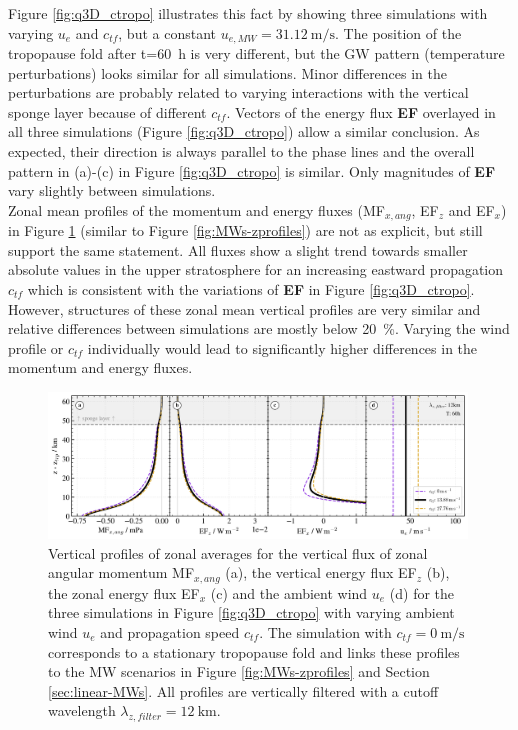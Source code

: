 %
Figure \ref{fig:q3D_ctropo} illustrates this fact by showing three simulations with varying $u_e$ and $c_{tf}$, but a constant $u_{e,MW}=\SI{31.12}{\meter\per\second}$. The position of the tropopause fold after t=\SI{60}{\hour} is very different, but the GW pattern (temperature perturbations) looks similar for all simulations. Minor differences in the perturbations are probably related to varying interactions with the vertical sponge layer because of different $c_{tf}$. Vectors of the energy flux \textbf{EF} overlayed in all three simulations (Figure \ref{fig:q3D_ctropo}) allow a similar conclusion. As expected, their direction is always parallel to the phase lines and the overall pattern in (a)-(c) in Figure \ref{fig:q3D_ctropo} is similar. Only magnitudes of \textbf{EF} vary slightly between simulations. \\
Zonal mean profiles of the momentum and energy fluxes (MF$_{x,ang}$, EF$_z$ and EF$_x$) in Figure \ref{fig:q3D_ctropo_vert} (similar to Figure \ref{fig:MWs-zprofiles}) are not as explicit, but still support the same statement. All fluxes show a slight trend towards smaller absolute values in the upper stratosphere for an increasing eastward propagation $c_{tf}$ which is consistent with the variations of \textbf{EF} in Figure \ref{fig:q3D_ctropo}. However, structures of these zonal mean vertical profiles are very similar and relative differences between simulations are mostly below \SI{20}{\percent}. Varying the wind profile or $c_{tf}$ individually would lead to significantly higher differences in the momentum and energy fluxes.\\
%
\begin{figure}[t]
    \centering
    \includegraphics[width=0.99\textwidth]{figures_q3D/TD-zprofiles-translbq3D_ctopo-T60h-avg.png}
    \caption{Vertical profiles of zonal averages for the vertical flux of zonal angular momentum MF$_{x,ang}$ (a), the vertical energy flux EF$_z$ (b), the zonal energy flux EF$_x$ (c) and the ambient wind $u_e$ (d) for the three simulations in Figure \ref{fig:q3D_ctropo} with varying ambient wind $u_e$ and propagation speed $c_{tf}$. The simulation with $c_{tf} = \SI{0}{\meter\per\second}$ corresponds to a stationary tropopause fold and links these profiles to the MW scenarios in Figure \ref{fig:MWs-zprofiles} and Section \ref{sec:linear-MWs}. All profiles are vertically filtered with a cutoff wavelength $\lambda_{z,filter}=\SI{12}{\kilo\meter}$.}
    \label{fig:q3D_ctropo_vert}
\end{figure}

